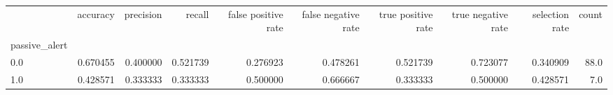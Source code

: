 \begin{tabular}{lrrrrrrrrr}
\toprule
{} &  accuracy &  precision &    recall &  false positive rate &  false negative rate &  true positive rate &  true negative rate &  selection rate &  count \\
passive\_alert &           &            &           &                      &                      &                     &                     &                 &        \\
\midrule
0.0           &  0.670455 &   0.400000 &  0.521739 &             0.276923 &             0.478261 &            0.521739 &            0.723077 &        0.340909 &   88.0 \\
1.0           &  0.428571 &   0.333333 &  0.333333 &             0.500000 &             0.666667 &            0.333333 &            0.500000 &        0.428571 &    7.0 \\
\bottomrule
\end{tabular}

